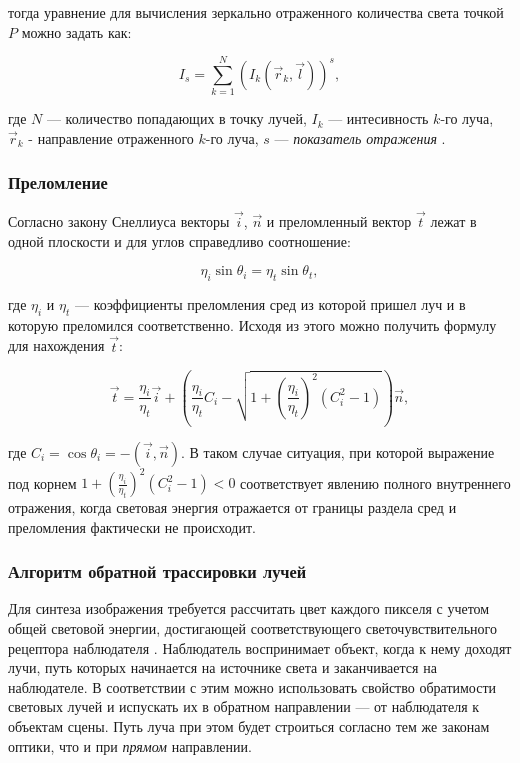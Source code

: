 тогда уравнение для вычисления зеркально отраженного количества света точкой $P$ можно задать как:

\begin{equation}
	\label{eq:specular_light}
	I_s = \sum_{k=1}^{N} {\left( I_k \left(\vec{r}_k, \vec{l}\right) \right)}^s,
\end{equation}

где $N$ --- количество попадающих в точку лучей, $I_k$ --- интесивность $k$-го луча, $\vec{r}_k$ - направление отраженного $k$-го луча, $s$ --- \textit{показатель отражения} \cite{gambetta_cg}.

\subsubsection*{Преломление}

Согласно закону Снеллиуса векторы $\vec{i}$, $\vec{n}$ и преломленный вектор $\vec{t}$ лежат в одной плоскости и для углов справедливо соотношение:

\begin{equation}
	\label{eq:snell_law}
	\eta_i\sin{\theta_i} = \eta_t\sin{\theta_t},
\end{equation}

где $\eta_i$ и $\eta_t$ --- коэффициенты преломления сред из которой пришел луч и в которую преломился соответственно. Исходя из этого можно получить формулу для нахождения $\vec{t}$:


\begin{equation}
	\label{eq:snell_law_vector_form}
	\vec{t} = \frac{\eta_i}{\eta_t}  \vec{i} + \left( \frac{\eta_i}{\eta_t} C_i - \sqrt{1 + \left(\frac{\eta_i}{\eta_t}\right)^2 ( C_i^2 - 1)} \right) \vec{n},
\end{equation}

где $C_i = \cos{\theta_i} = -( \vec{i}, \vec{n} )$. В таком случае ситуация, при которой выражение под корнем $1 + \left(\frac{\eta_i}{\eta_t}\right)^2 ( C_i^2 - 1) < 0$ соответствует явлению полного внутреннего отражения, когда световая энергия отражается от границы раздела сред и преломления фактически не происходит.

\subsubsection{Алгоритм обратной трассировки лучей}

Для синтеза изображения требуется рассчитать цвет каждого пикселя с учетом общей световой энергии, достигающей соответствующего светочувствительного рецептора наблюдателя \cite{nikulin_optic_effects}. Наблюдатель воспринимает объект, когда к нему доходят лучи, путь которых начинается на источнике света и заканчивается на наблюдателе. В соответствии с этим можно использовать свойство обратимости световых лучей и испускать их в обратном направлении --- от наблюдателя к объектам сцены. Путь луча при этом будет строиться согласно тем же законам оптики, что и при \textit{прямом} направлении.

